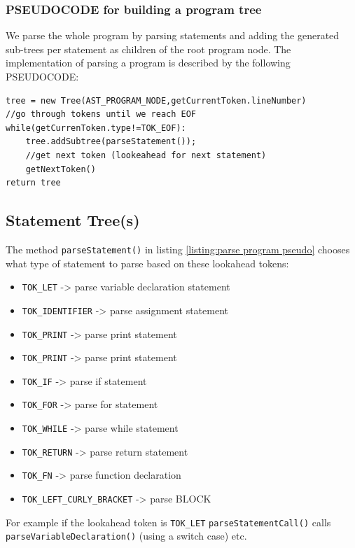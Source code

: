 \subsubsection{PSEUDOCODE for building a program tree}
We parse the whole program by parsing statements and adding the generated sub-trees per statement as children of the root program node. The implementation of parsing a program is described by the following PSEUDOCODE: 
\begin{lstlisting}[caption=PSEUDOCODE for building a program tree,label=listing:parse program pseudo]
tree = new Tree(AST_PROGRAM_NODE,getCurrentToken.lineNumber)
//go through tokens until we reach EOF
while(getCurrenToken.type!=TOK_EOF):
    tree.addSubtree(parseStatement());
    //get next token (lookeahead for next statement)
    getNextToken()
return tree
\end{lstlisting}
\subsection{Statement Tree(s)}
\label{sec:statement trees ast}
The method \verb!parseStatement()! in listing \ref{listing:parse program pseudo} chooses what type of statement to parse based on these lookahead tokens:
\begin{itemize}
	\item \verb!TOK_LET! -> parse variable declaration statement
	\item \verb!TOK_IDENTIFIER! -> parse assignment statement
	\item \verb!TOK_PRINT! -> parse print statement
	\item \verb!TOK_PRINT! -> parse print statement
	\item \verb!TOK_IF! -> parse if statement
	\item \verb!TOK_FOR! -> parse for statement
	\item \verb!TOK_WHILE! -> parse while statement
	\item \verb!TOK_RETURN! -> parse return statement
	\item \verb!TOK_FN! -> parse function declaration
	\item \verb!TOK_LEFT_CURLY_BRACKET! -> parse BLOCK
\end{itemize}

For example if the lookahead token is \verb!TOK_LET! \verb!parseStatementCall()! calls \verb!parseVariableDeclaration()! (using a switch case) etc.
